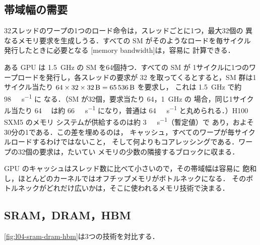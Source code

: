\documentclass[../main.tex]{subfiles}
\begin{document}
\subsection{帯域幅の需要}

32スレッドのワープの1つのロード命令は，スレッドごとに1つ，最大32個の
異なるメモリ要求を生成しうる．すべての SM がそのようなロードを毎サイクル
発行したときに必要となる
[memory bandwidth]は，容易に
計算できる．

\begin{example}
  \label{ex:l04-bandwidth-demand}
  ある GPU は \SI{1.5}{\giga\hertz} の SM を64個持つ．すべての SM が
  1サイクルに1つのワープロードを発行し，各スレッドの要求が
  \SI{32}{\byte} を取ってくるとすると，SM 群は1サイクル当たり
  $64 \times 32 \times \SI{32}{\byte} = \SI{65536}{\byte}$ を要求し，
  これは \SI{1.5}{\giga\hertz} で約 \SI{98}{\tera\byte\per\second} に
  なる．（SM が32個，要求当たり \SI{64}{\byte}，\SI{1}{\giga\hertz} の
  場合，同じ1サイクル当たり \SI{64}{\kibi\byte} は約
  \SI{66}{\tera\byte\per\second} になり，普通は
  \SI{64}{\tera\byte\per\second} と丸められる．）H100 SXM5 のメモリ
  システムが供給するのは約 \SI{3}{\tera\byte\per\second}（暫定値）で
  あり，およそ30分の1である．この差を埋めるのは，
  キャッシュ，すべてのワープが毎サイクルロードするわけではないこと，
  そして何よりもコアレッシングである．ワープの32個の要求は，たいてい
  メモリの少数の隣接するブロックに収まる．
\end{example}

GPU のキャッシュはスレッド数に比べて小さいので，その帯域幅は容易に
飽和し，ほとんどのカーネルではオフチップメモリがボトルネックになる．
そのボトルネックがどれだけ広いかは，そこに使われるメモリ技術で決まる．

\subsection{SRAM，DRAM，HBM}

\cref{fig:l04-sram-dram-hbm}は3つの技術を対比する．
\end{document}

